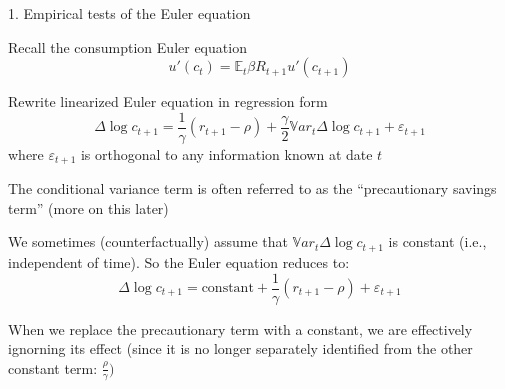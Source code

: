 \documentclass[11pt, aspectratio=169]{beamer}
\newenvironment{witemize}{\itemize\addtolength{\itemsep}{10pt}}{\enditemize}
\begin{document}
\begin{frame}{1. Empirical tests of the Euler equation}

\begin{witemize}
\item Recall the consumption Euler equation
\begin{equation*}
	u' (c_t) = \mathbb E_t \beta R_{t+1} u'(c_{t+1}) 
\end{equation*}

\item Rewrite linearized Euler equation in regression form
\begin{equation*}
	\Delta \log c_{t+1} = \frac{1}{\gamma} (r_{t+1} - \rho) + \frac{\gamma}{2} \mathbb Var_t \Delta \log c_{t+1} + \varepsilon_{t+1} 
\end{equation*}
where $\varepsilon_{t+1}$ is orthogonal to any information known at date $t$

\item The conditional variance term is often referred to as the ``precautionary
savings term'' (more on this later)
\end{witemize}
\end{frame}

\begin{frame}{}

\begin{witemize}
\item We sometimes (counterfactually) assume that $\mathbb Var_t \Delta \log c_{t+1}$ is constant (i.e., independent of time). So the Euler equation reduces to: 
\begin{equation*}
	\Delta \log c_{t+1} = \text{constant} + \frac{1}{\gamma} (r_{t+1} - \rho) +\varepsilon_{t+1} 
\end{equation*}

\item When we replace the precautionary term with a constant, we are effectively ignorning its effect (since it is no longer separately identified from the other constant term: $\frac{\rho}{\gamma})$
\end{witemize}
\end{frame}
\end{document}
